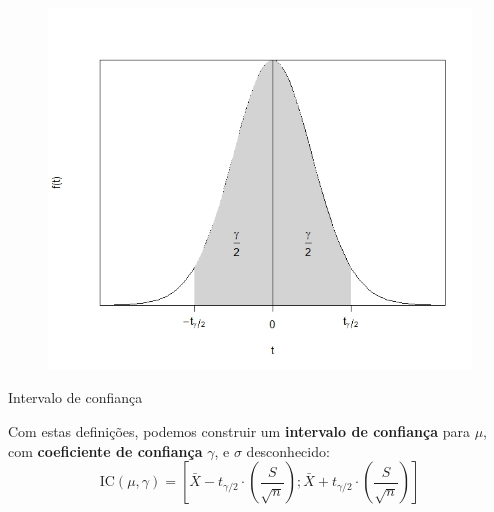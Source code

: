 \documentclass[14pt,aspectratio=1610]{beamer}
\begin{document}
	\begin{frame}{}
		\begin{block}{}
			\justifying
			\begin{figure}
				\centering
				\includegraphics[scale=0.6]{figs/ICtStudent.jpeg}
			\end{figure}  
		\end{block}
	\end{frame}
	
	\begin{frame}{Intervalo de confiança}
		\begin{block}{}
			\justifying
			Com estas definições, podemos construir um \textbf{intervalo de confiança} para $\mu$, com \textbf{coeficiente de confiança} $\gamma$, e
			$\sigma$ desconhecido:
			$$
			\text{IC}(\mu, \gamma) = \left[ \bar{X} - t_{\gamma/2} \cdot
			\left(\frac{S}{\sqrt{n}}\right) ; \bar{X} + t_{\gamma/2} \cdot
			\left(\frac{S}{\sqrt{n}}\right)  \right]
			$$   
			
		\end{block}
	\end{frame}
	
\end{document}
